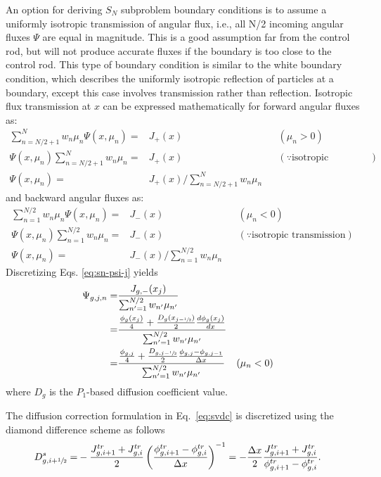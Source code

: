An option for deriving $S_N$ subproblem boundary conditions is to assume a uniformly
isotropic transmission of angular flux, i.e., all N/2 incoming angular fluxes $\Psi$ are equal in
magnitude. This is a good assumption far from the control rod, but will not produce accurate
fluxes if the boundary is too close to the control rod. This type of boundary condition is similar
to the white boundary condition, which describes the uniformly
isotropic reflection of particles at a boundary, except this case involves transmission rather than
reflection. Isotropic flux transmission at $x$ can be expressed mathematically for forward angular
fluxes as:
%
\begin{align}
  \sum^N_{n=N/2+1}w_n\mu_n\Psi(x,\mu_n) =& J_{+}(x) && (\mu_n>0) \nonumber \\
  \Psi(x,\mu_n)\sum^N_{n=N/2+1}w_n\mu_n =& J_{+}(x) && (\because \mbox{isotropic transmission})
  \nonumber \\
  \Psi(x,\mu_n) =& J_{+}(x)\Bigg/\sum^N_{n=N/2+1}w_n\mu_n
\end{align}
%
and backward angular fluxes as:
%
\begin{align}
  \sum^{N/2}_{n=1}w_n\mu_n\Psi(x,\mu_n) =& J_{-}(x) && (\mu_n<0) \nonumber \\
  \Psi(x,\mu_n)\sum^{N/2}_{n=1}w_n\mu_n =& J_{-}(x) && (\because \mbox{isotropic transmission})
  \nonumber \\
  \Psi(x,\mu_n) =& J_{-}(x)\Bigg/\sum^{N/2}_{n=1}w_n\mu_n \label{eq:sn-psi-j}
\end{align}
%
Discretizing Eqs. \ref{eq:sn-psi-j} yields
%
\begin{align}
  \Psi_{g,j,n} =& \frac{J_{g,-}(x_j)}{\sum^{N/2}_{n'=1}w_{n'}\mu_{n'}} \nonumber \\
  =& \frac{\frac{\phi_g(x_j)}{4}+
  \frac{D_g(x_{j-\sfrac{1}{2}})}{2}\frac{d\phi_g(x_j)}{dx}}{\sum^{N/2}_{n'=1}w_{n'}\mu_{n'}}
  \nonumber \\
  =& \frac{\frac{\phi_{g,j}}{4}+
  \frac{D_{g,j-\sfrac{1}{2}}}{2}\frac{\phi_{g,j}-\phi_{g,j-1}}{\Delta x}}
    {\sum^{N/2}_{n'=1}w_{n'}\mu_{n'}} && (\mu_n < 0) \label{eq:sn-bc}
\end{align}
%
where $D_g$ is the $P_1$-based diffusion coefficient value.

The diffusion correction formulation in Eq.\ \ref{eq:svdc} is discretized using the diamond
difference scheme as follows
%
\begin{align}
  D^s_{g,i+\sfrac{1}{2}} =& -\frac{J^{tr}_{g,i+1}+J^{tr}_{g,i}}{2} \left(
  \frac{\phi^{tr}_{g,i+1}-\phi^{tr}_{g,i}}{\Delta x} \right)^{-1} = -\frac{\Delta x}{2}
  \frac{J^{tr}_{g,i+1}+J^{tr}_{g,i}}{\phi^{tr}_{g,i+1}-\phi^{tr}_{g,i}}. \label{eq:svdc-num}
\end{align}

